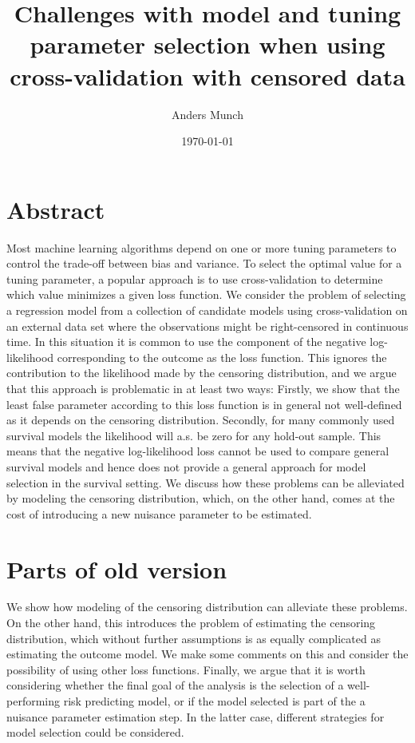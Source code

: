 \documentclass[11pt]{article}
\author{Anders Munch}
\date{\today}
\title{Challenges with model and tuning parameter selection when using cross-validation with censored data}
\begin{document}
\maketitle

\section{Abstract}
\label{sec:org304af21}
Most machine learning algorithms depend on one or more tuning parameters to control the trade-off
between bias and variance. To select the optimal value for a tuning parameter, a popular approach is
to use cross-validation to determine which value minimizes a given loss function. We consider the
problem of selecting a regression model from a collection of candidate models using cross-validation
on an external data set where the observations might be right-censored in continuous time. In this
situation it is common to use the component of the negative log-likelihood corresponding to the
outcome as the loss function. This ignores the contribution to the likelihood made by the censoring
distribution, and we argue that this approach is problematic in at least two ways: Firstly, we show
that the least false parameter according to this loss function is in general not well-defined as it
depends on the censoring distribution. Secondly, for many commonly used survival models the
likelihood will a.s. be zero for any hold-out sample. This means that the negative log-likelihood
loss cannot be used to compare general survival models and hence does not provide a general approach
for model selection in the survival setting. We discuss how these problems can be alleviated by
modeling the censoring distribution, which, on the other hand, comes at the cost of introducing a
new nuisance parameter to be estimated.

\section{Parts of old version}
\label{sec:orgdda95c1}

We show how modeling of the censoring distribution can alleviate these problems. On the other hand,
this introduces the problem of estimating the censoring distribution, which without further
assumptions is as equally complicated as estimating the outcome model. We make some comments on this
and consider the possibility of using other loss functions. Finally, we argue that it is worth
considering whether the final goal of the analysis is the selection of a well-performing risk
predicting model, or if the model selected is part of the a nuisance parameter estimation step. In
the latter case, different strategies for model selection could be considered.
\end{document}
